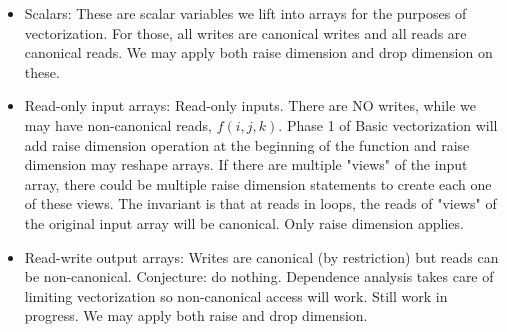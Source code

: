 \begin{itemize}

\item Scalars: These are scalar variables we lift into arrays for the purposes of vectorization. 
For those, all writes are canonical writes and all reads are canonical reads. We may apply both raise dimension 
and drop dimension on these.

\item Read-only input arrays: Read-only inputs. There are NO writes, while we may have non-canonical reads, $f(i,j,k)$. 
Phase 1 of Basic vectorization will add raise dimension operation at the beginning of the function and raise dimension 
may reshape arrays. If there are multiple "views" of the input array, there could be multiple raise dimension statements to create
each one of these views. The invariant is that at reads in loops, the reads of "views" of the original input array will be canonical.
Only raise dimension applies.
 
 \item Read-write output arrays: Writes are canonical (by restriction) but reads can be non-canonical. Conjecture:
 do nothing. Dependence analysis takes care of limiting vectorization so non-canonical access will work. 
Still work in progress. We may apply both raise and drop dimension. 

\end{itemize}


%
